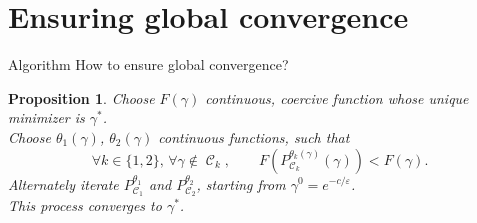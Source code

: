 \documentclass[compress]{beamer}
\DeclareMathOperator{\Ccal}{\mathcal{C}}
\renewcommand{\epsilon}{\varepsilon}
\newtheorem{proposition}{Proposition}
\begin{document}
\section{Ensuring global convergence}

\begin{frame}{Algorithm}
How to ensure global convergence?
\pause
\begin{proposition}
Choose $F(\gamma)$ continuous, coercive function whose unique minimizer is $\gamma^*$.\\
Choose $\theta_1(\gamma)$, $\theta_2(\gamma)$ continuous functions, such that
\begin{equation*}\label{eq:cond_theta_k}
\forall k \in \{1,2\}, \, \forall \gamma \notin \Ccal_k,\quad\quad
F(P_{\Ccal_k}^{\theta_k(\gamma)}(\gamma)) < F(\gamma).
\end{equation*}
\pause
Alternately iterate $P_{\Ccal_1}^{\theta_1}$ and $P_{\Ccal_2}^{\theta_2}$, starting from $\gamma^0 = e^{-c/\epsilon}$.\\
This process converges to $\gamma^*$.
\end{proposition}
\end{frame}
\end{document}

